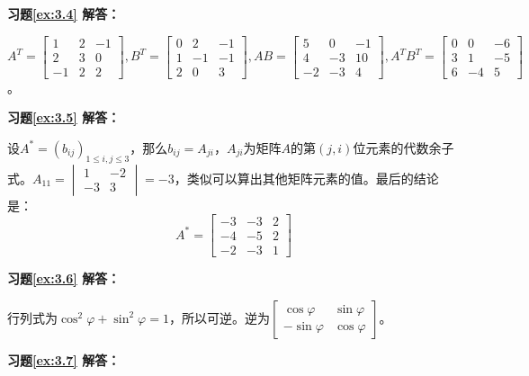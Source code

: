 \documentclass[a4paper]{book}
\begin{document}
\vspace{1.5em}

\textbf{习题\ref{ex:3.4} 解答：}

$A^T = \begin{bmatrix} 1 & 2 & -1 \\ 2 & 3 & 0 \\ -1 & 2 & 2 \end{bmatrix}, B^T = \begin{bmatrix} 0 & 2 & -1 \\ 1 & -1 & -1 \\ 2 & 0 & 3 \end{bmatrix}, AB = \begin{bmatrix} 5 & 0 & -1 \\ 4  & -3 & 10 \\ -2 & -3 & 4 \end{bmatrix}, A^TB^T = \begin{bmatrix} 0 & 0 & -6 \\ 3 & 1 & -5 \\ 6 & -4 & 5 \end{bmatrix}$。

\vspace{1.5em}

\textbf{习题\ref{ex:3.5} 解答：}

设$A^{\ast} = (b_{ij})_{1 \leqslant i,j \leqslant 3}$，那么$b_{ij} = A_{ji}$，$A_{ji}$为矩阵$A$的第$(j,i)$位元素的代数余子式。$A_{11} = \begin{vmatrix} 1 & -2 \\ -3 & 3 \end{vmatrix} = -3$，类似可以算出其他矩阵元素的值。最后的结论是：
$$A^{\ast} = \begin{bmatrix} -3 & -3 & 2 \\ -4 & -5 & 2 \\ -2 & -3 & 1 \end{bmatrix}$$

\vspace{1.5em}

\textbf{习题\ref{ex:3.6} 解答：}

行列式为$\cos^2\varphi + \sin^2\varphi = 1$，所以可逆。逆为$\begin{bmatrix} \cos\varphi & \sin\varphi \\ -\sin\varphi & \cos\varphi \end{bmatrix}$。

\vspace{1.5em}

\textbf{习题\ref{ex:3.7} 解答：}
\end{document}
